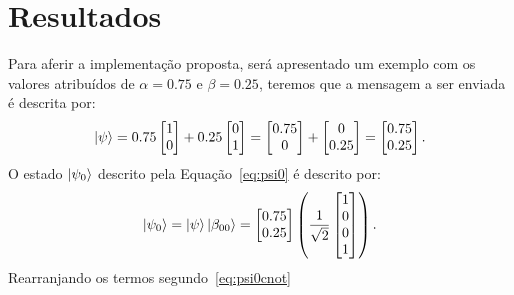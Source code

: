 \chapter{Resultados}

Para aferir a implementação proposta, será apresentado um exemplo com os valores atribuídos de $\alpha = \num{0.75}$ e $\beta = \num{0.25}$, teremos que a mensagem a ser enviada é descrita por:
\begin{equation}
  \ket{\psi} = \num{0.75} \begin{bmatrix} 1 \\ 0 \end{bmatrix} +
  \num{0.25} \begin{bmatrix} 0 \\ 1 \end{bmatrix} =
  \begin{bmatrix} \num{0.75} \\ 0 \end{bmatrix} +
  \begin{bmatrix} 0 \\ \num{0.25} \end{bmatrix} =
  \begin{bmatrix} \num{0.75} \\ \num{0.25} \end{bmatrix}.
\end{equation}
O estado $\ket{\psi_0}$ descrito pela Equação~\eqref{eq:psi0} é descrito por:
\begin{equation}
  \ket{\psi_0} = \ket{\psi}\ket{\beta_{00}} =
  \begin{bmatrix} \num{0.75} \\ \num{0.25} \end{bmatrix}
  \left(\frac{1}{\sqrt{2}} \begin{bmatrix} 1 \\ 0 \\ 0 \\ 1 \end{bmatrix}\right).
\end{equation}
Rearranjando os termos segundo~\eqref{eq:psi0cnot}
